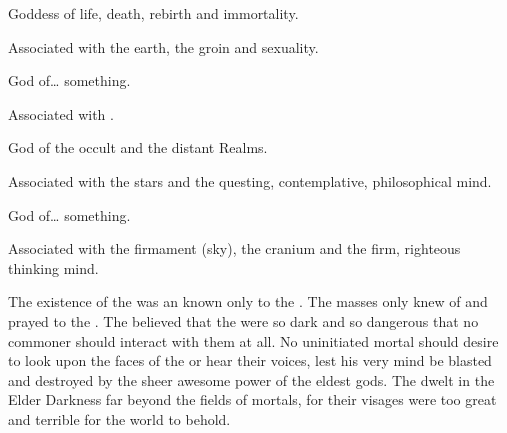 \begin{gloss}
  \begin{comment}
  \subparagraph{\Costorul}
  \end{comment}
  \index{\Costorul}
  \index{\KhothSell}
  Goddess of life, death, rebirth and immortality. 
  
  Associated with the earth, the groin and sexuality. 
  
  
  
  \begin{comment}
  \subparagraph{\Kythraxas}
  \end{comment}
  \index{\KyaethemChreiAz}
  \index{\Kythraxas}
  God of\ldots{} something. 
  
  Associated with . 
  
  
  
  \begin{comment}
  \subparagraph{\Nelxurra}
  \end{comment}
  \index{\Nelxurra}
  \index{\NerrhanKoss}
  God of the occult and the distant Realms. 
  
  Associated with the stars and the questing, contemplative, philosophical mind. 
  
  
  
  \begin{comment}
  \subparagraph{\Rammasul}
  \end{comment}
  \index{\NerrhanKoss}
  \index{\Rammasul}
  God of\ldots{} something. 
  
  Associated with the firmament (sky), the cranium and the firm, righteous thinking mind. 
\end{gloss}



The existence of the \Primordials was an \arcanum known only to the \rethyaxes. 
The masses only knew of and prayed to the \Taorthae. 
The \rethyaxes believed that the \Primordials were so dark and so dangerous that no commoner should interact with them at all. 
No uninitiated mortal should desire to look upon the faces of the \Primordials or hear their voices, lest his very mind be blasted and destroyed by the sheer awesome power of the eldest gods. 
The \Primordials dwelt in the Elder Darkness far beyond the fields of mortals, for their visages were too great and terrible for the world to behold. 

